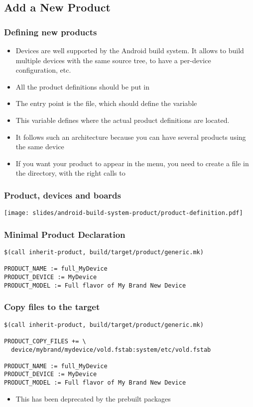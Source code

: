 \subsection{Add a New Product}

\begin{frame}
  \frametitle{Defining new products}
  \begin{itemize}
  \item Devices are well supported by the Android build system. It allows
    to build multiple devices with the same source tree, to have a
    per-device configuration, etc.
  \item All the product definitions should be put in
  \item The entry point is the  file, which
    should define the  variable
  \item This variable defines where the actual product definitions are
    located.
  \item It follows such an architecture because you can have several
    products using the same device
  \item If you want your product to appear in the  menu, you need
    to create a  file in the  directory,
    with the right calls to 
  \end{itemize}
\end{frame}

\begin{frame}
  \frametitle{Product, devices and boards}
  \begin{center}
    \texttt{[image: slides/android-build-system-product/product-definition.pdf]}
  \end{center}
\end{frame}

\begin{frame}[fragile]
  \frametitle{Minimal Product Declaration}
\begin{verbatim}
$(call inherit-product, build/target/product/generic.mk)

PRODUCT_NAME := full_MyDevice
PRODUCT_DEVICE := MyDevice
PRODUCT_MODEL := Full flavor of My Brand New Device
\end{verbatim}
\end{frame}

\begin{frame}[fragile]
  \frametitle{Copy files to the target}
\begin{verbatim}
$(call inherit-product, build/target/product/generic.mk)

PRODUCT_COPY_FILES += \
  device/mybrand/mydevice/vold.fstab:system/etc/vold.fstab

PRODUCT_NAME := full_MyDevice
PRODUCT_DEVICE := MyDevice
PRODUCT_MODEL := Full flavor of My Brand New Device
\end{verbatim}
\begin{itemize}
  \item This has been deprecated by the prebuilt packages
\end{itemize}
\end{frame}

